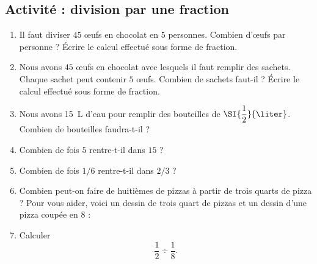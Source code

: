 
\subsection*{Activité : division par une fraction}

\begin{enumerate}
    \item
        Il faut diviser \( 45\) œufs en chocolat en \( 5\) personnes. Combien d'œufs par personne ? Écrire le calcul effectué sous forme de fraction.
    \item
        Nous avons \( 45\) œufs en chocolat avec lesquels il faut remplir des sachets. Chaque sachet peut contenir \( 5\) œufs. Combien de sachets faut-il ? Écrire le calcul effectué sous forme de fraction.
    \item
        Nous avons \SI{15}{\liter} d'eau pour remplir des bouteilles de $\SI{\dfrac{ 1 }{ 2 }}{\liter}$. Combien de bouteilles faudra-t-il ?
    \item
        Combien de fois \( 5\) rentre-t-il dans \( 15\) ?
    \item
        Combien de fois \( 1/6\) rentre-t-il dans \( 2/3\) ?

\begin{center}
   
\end{center}
\begin{center}
   
\end{center}



    \item
        Combien peut-on faire de huitièmes de pizzas à partir de trois quarts de pizza ? Pour vous aider, voici un dessin de trois quart de pizzas et un dessin d'une pizza coupée en \( 8\) :
        \begin{center}
           
           
        \end{center}
    \item
        Calculer
        \begin{equation}
            \dfrac{ 1 }{ 2 }\div\frac{1}{ 8 }.
        \end{equation}
\end{enumerate}

